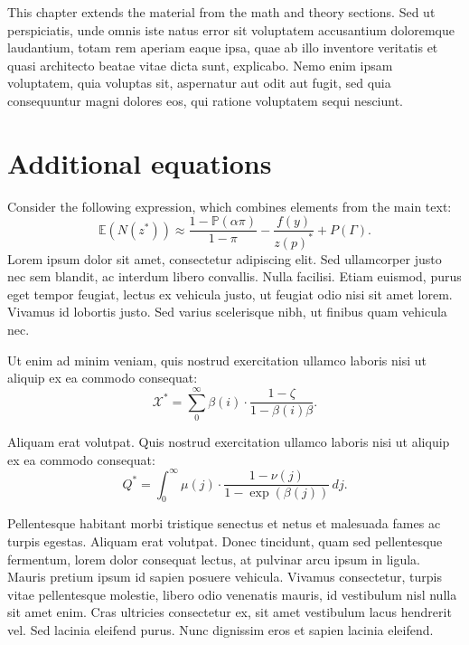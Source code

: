 This chapter extends the material from the math and theory sections. Sed ut perspiciatis, unde omnis iste natus error sit voluptatem accusantium doloremque laudantium, totam rem aperiam eaque ipsa, quae ab illo inventore veritatis et quasi architecto beatae vitae dicta sunt, explicabo. Nemo enim ipsam voluptatem, quia voluptas sit, aspernatur aut odit aut fugit, sed quia consequuntur magni dolores eos, qui ratione voluptatem sequi nesciunt.

\section{Additional equations}\label{s:further}

Consider the following expression, which combines elements from the main text:
\begin{equation}
\mathbb{E}(N(z^*)) \approx \frac{1-\mathbb{P}(\alpha\pi)}{1-\pi}- \frac{f(y)}{z(p)^*} + P(\Gamma).
\label{e:cv3}\end{equation}
Lorem ipsum dolor sit amet, consectetur adipiscing elit. Sed ullamcorper justo nec sem blandit, ac interdum libero convallis. Nulla facilisi. Etiam euismod, purus eget tempor feugiat, lectus ex vehicula justo, ut feugiat odio nisi sit amet lorem. Vivamus id lobortis justo. Sed varius scelerisque nibh, ut finibus quam vehicula nec.

\begin{lemma} Ut enim ad minim veniam, quis nostrud exercitation ullamco laboris nisi ut aliquip ex ea commodo consequat:
\begin{equation*}
\mathcal{X}^* = \sum_{0}^{\infty} \beta(i) \cdot \frac{1-\zeta}{1-\beta(i)\beta}.
\end{equation*}
\end{lemma}

\begin{lemma} Aliquam erat volutpat. Quis nostrud exercitation ullamco laboris nisi ut aliquip ex ea commodo consequat:
\begin{equation}
Q^* = \int_{0}^{\infty} \mu(j) \cdot \frac{1-\nu(j)}{1-\exp(\beta(j))}\,dj.
\label{e:cv2}\end{equation}
\end{lemma}

Pellentesque habitant morbi tristique senectus et netus et malesuada fames ac turpis egestas. Aliquam erat volutpat. Donec tincidunt, quam sed pellentesque fermentum, lorem dolor consequat lectus, at pulvinar arcu ipsum in ligula. Mauris pretium ipsum id sapien posuere vehicula. Vivamus consectetur, turpis vitae pellentesque molestie, libero odio venenatis mauris, id vestibulum nisl nulla sit amet enim. Cras ultricies consectetur ex, sit amet vestibulum lacus hendrerit vel. Sed lacinia eleifend purus. Nunc dignissim eros et sapien lacinia eleifend.

